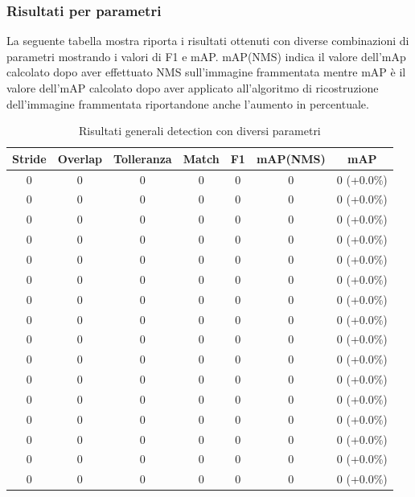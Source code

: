 \clearpage
\subsubsection{Risultati per parametri}
La seguente tabella mostra riporta i risultati ottenuti con diverse combinazioni di parametri mostrando i valori di F1 e mAP. mAP(NMS) indica il valore dell'mAp calcolato dopo aver effettuato NMS sull'immagine frammentata mentre mAP è il valore dell'mAP calcolato dopo aver applicato all'algoritmo di ricostruzione dell'immagine frammentata riportandone anche l'aumento in percentuale.

\begin{table}[h!]
\centering
\begin{tabular}{|c|c|c|c|c|c|c|} 
\hline
Stride & Overlap & Tolleranza & Match & F1 & mAP(NMS) & mAP\\ [0.5ex] 
\hline
0 & 0 & 0 & 0 & 0 & 0 & 0 (+0.0\%)\\
0 & 0 & 0 & 0 & 0 & 0 & 0 (+0.0\%)\\
0 & 0 & 0 & 0 & 0 & 0 & 0 (+0.0\%)\\
0 & 0 & 0 & 0 & 0 & 0 & 0 (+0.0\%)\\
0 & 0 & 0 & 0 & 0 & 0 & 0 (+0.0\%)\\
0 & 0 & 0 & 0 & 0 & 0 & 0 (+0.0\%)\\
0 & 0 & 0 & 0 & 0 & 0 & 0 (+0.0\%)\\
0 & 0 & 0 & 0 & 0 & 0 & 0 (+0.0\%)\\
0 & 0 & 0 & 0 & 0 & 0 & 0 (+0.0\%)\\
0 & 0 & 0 & 0 & 0 & 0 & 0 (+0.0\%)\\
0 & 0 & 0 & 0 & 0 & 0 & 0 (+0.0\%)\\
0 & 0 & 0 & 0 & 0 & 0 & 0 (+0.0\%)\\
0 & 0 & 0 & 0 & 0 & 0 & 0 (+0.0\%)\\
0 & 0 & 0 & 0 & 0 & 0 & 0 (+0.0\%)\\
0 & 0 & 0 & 0 & 0 & 0 & 0 (+0.0\%)\\
0 & 0 & 0 & 0 & 0 & 0 & 0 (+0.0\%)\\
\hline
\end{tabular}
\caption{Risultati generali detection con diversi parametri}
\label{lista risultati}
\end{table}

